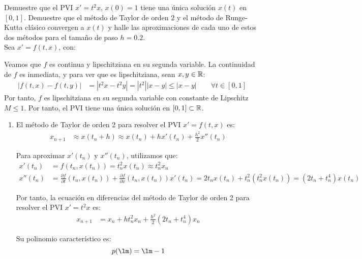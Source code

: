 \begin{ejercicio}\label{ej:3.1.8}
    Demuestre que el PVI $x' = t^2 x$, $x(0) = 1$ tiene una única solución $x(t)$ en $[0, 1]$. Demuestre que el método de Taylor de orden 2 y el método de Runge-Kutta clásico convergen a $x(t)$ y halle las aproximaciones de cada uno de estos dos métodos para el tamaño de paso $h = 0.2$.\\

    Sea $x'=f(t, x)$, con:

    Veamos que $f$ es continua y lipschitziana en su segunda variable. La continuidad de $f$ es inmediata, y para ver que es lipschitziana, sean $x,y\in \mathbb{R}$:
    \begin{align*}
        |f(t, x) - f(t, y)| &= |t^2 x - t^2 y| = |t^2||x - y| \leq |x-y|\qquad \forall t\in [0, 1]
    \end{align*}
    Por tanto, $f$ es lipschitziana en su segunda variable con constante de Lipschitz $M \leq 1$. Por tanto, el PVI tiene una única solución en $[0,1]\subset \mathbb{R}$.

    \begin{enumerate}
        \item El método de Taylor de orden 2 para resolver el PVI $x' = f(t, x)$ es:
        \begin{align*}
            x_{n+1} &\approx x(t_n + h) \approx x(t_n) + hx'(t_n) + \frac{h^2}{2} x''(t_n)
        \end{align*}

        Para aproximar $x'(t_n)$ y $x''(t_n)$, utilizamos que:
        \begin{align*}
            x'(t_n) &= f(t_n, x(t_n)) = t_n^2 x(t_n)\approx t_n^2 x_n \\
            x''(t_n) &= \frac{\partial f}{\partial t}(t_n, x(t_n)) + \frac{\partial f}{\partial x}(t_n, x(t_n)) x'(t_n) = 2 t_n x(t_n) + t_n^2 (t_n^2 x(t_n)) = (2 t_n + t_n^4) x(t_n)
        \end{align*}

        Por tanto, la ecuación en diferencias del método de Taylor de orden 2 para resolver el PVI $x' = t^2 x$ es:
        \begin{align*}
            x_{n+1} &= x_n + h t_n^2 x_n + \frac{h^2}{2} (2 t_n + t_n^4) x_n
        \end{align*}

        Su polinomio característico es:
        \begin{equation*}
            p(\lm) = \lm - 1
        \end{equation*}


\end{enumerate}
\end{ejercicio}
